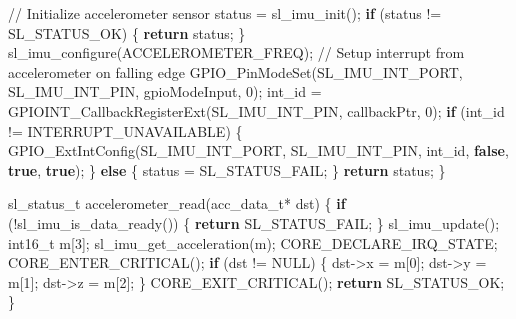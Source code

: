 \documentclass[
  9pt,
  letterpaper,
  abstract,
  titlepage]{scrbook}
\newenvironment{Shaded}{\begin{snugshade}}{\end{snugshade}}
\newcommand{\CommentTok}[1]{\textcolor[rgb]{0.37,0.37,0.37}{#1}}
\newcommand{\ControlFlowTok}[1]{\textcolor[rgb]{0.00,0.23,0.31}{\textbf{#1}}}
\newcommand{\DataTypeTok}[1]{\textcolor[rgb]{0.68,0.00,0.00}{#1}}
\newcommand{\DecValTok}[1]{\textcolor[rgb]{0.68,0.00,0.00}{#1}}
\newcommand{\KeywordTok}[1]{\textcolor[rgb]{0.00,0.23,0.31}{\textbf{#1}}}
\newcommand{\NormalTok}[1]{\textcolor[rgb]{0.00,0.23,0.31}{#1}}
\newcommand{\OperatorTok}[1]{\textcolor[rgb]{0.37,0.37,0.37}{#1}}
\begin{document}
\begin{Shaded}
\begin{Highlighting}[]
  \CommentTok{// Initialize accelerometer sensor}
\NormalTok{  status }\OperatorTok{=}\NormalTok{ sl\_imu\_init}\OperatorTok{();}
  \ControlFlowTok{if} \OperatorTok{(}\NormalTok{status }\OperatorTok{!=}\NormalTok{ SL\_STATUS\_OK}\OperatorTok{)} \OperatorTok{\{}
    \ControlFlowTok{return}\NormalTok{ status}\OperatorTok{;}
  \OperatorTok{\}}
\NormalTok{  sl\_imu\_configure}\OperatorTok{(}\NormalTok{ACCELEROMETER\_FREQ}\OperatorTok{);}
  \CommentTok{// Setup interrupt from accelerometer on falling edge}
\NormalTok{  GPIO\_PinModeSet}\OperatorTok{(}\NormalTok{SL\_IMU\_INT\_PORT}\OperatorTok{,}\NormalTok{ SL\_IMU\_INT\_PIN}\OperatorTok{,}\NormalTok{ gpioModeInput}\OperatorTok{,} \DecValTok{0}\OperatorTok{);}
\NormalTok{  int\_id }\OperatorTok{=}\NormalTok{ GPIOINT\_CallbackRegisterExt}\OperatorTok{(}\NormalTok{SL\_IMU\_INT\_PIN}\OperatorTok{,}\NormalTok{ callbackPtr}\OperatorTok{,} \DecValTok{0}\OperatorTok{);}
  \ControlFlowTok{if} \OperatorTok{(}\NormalTok{int\_id }\OperatorTok{!=}\NormalTok{ INTERRUPT\_UNAVAILABLE}\OperatorTok{)} \OperatorTok{\{}
\NormalTok{    GPIO\_ExtIntConfig}\OperatorTok{(}\NormalTok{SL\_IMU\_INT\_PORT}\OperatorTok{,}\NormalTok{ SL\_IMU\_INT\_PIN}\OperatorTok{,}\NormalTok{ int\_id}\OperatorTok{,} \KeywordTok{false}\OperatorTok{,} \KeywordTok{true}\OperatorTok{,} \KeywordTok{true}\OperatorTok{);}
  \OperatorTok{\}} \ControlFlowTok{else} \OperatorTok{\{}
\NormalTok{    status }\OperatorTok{=}\NormalTok{ SL\_STATUS\_FAIL}\OperatorTok{;}
  \OperatorTok{\}}
  \ControlFlowTok{return}\NormalTok{ status}\OperatorTok{;}
\OperatorTok{\}}

\NormalTok{sl\_status\_t accelerometer\_read}\OperatorTok{(}\NormalTok{acc\_data\_t}\OperatorTok{*}\NormalTok{ dst}\OperatorTok{)}
\OperatorTok{\{}
  \ControlFlowTok{if} \OperatorTok{(!}\NormalTok{sl\_imu\_is\_data\_ready}\OperatorTok{())} \OperatorTok{\{}
    \ControlFlowTok{return}\NormalTok{ SL\_STATUS\_FAIL}\OperatorTok{;}
  \OperatorTok{\}}
\NormalTok{  sl\_imu\_update}\OperatorTok{();}
  \DataTypeTok{int16\_t}\NormalTok{ m}\OperatorTok{[}\DecValTok{3}\OperatorTok{];}
\NormalTok{  sl\_imu\_get\_acceleration}\OperatorTok{(}\NormalTok{m}\OperatorTok{);}
\NormalTok{  CORE\_DECLARE\_IRQ\_STATE}\OperatorTok{;}
\NormalTok{  CORE\_ENTER\_CRITICAL}\OperatorTok{();}
  \ControlFlowTok{if} \OperatorTok{(}\NormalTok{dst }\OperatorTok{!=}\NormalTok{ NULL}\OperatorTok{)} \OperatorTok{\{}
\NormalTok{    dst}\OperatorTok{{-}\textgreater{}}\NormalTok{x }\OperatorTok{=}\NormalTok{ m}\OperatorTok{[}\DecValTok{0}\OperatorTok{];}
\NormalTok{    dst}\OperatorTok{{-}\textgreater{}}\NormalTok{y }\OperatorTok{=}\NormalTok{ m}\OperatorTok{[}\DecValTok{1}\OperatorTok{];}
\NormalTok{    dst}\OperatorTok{{-}\textgreater{}}\NormalTok{z }\OperatorTok{=}\NormalTok{ m}\OperatorTok{[}\DecValTok{2}\OperatorTok{];}
  \OperatorTok{\}}
\NormalTok{  CORE\_EXIT\_CRITICAL}\OperatorTok{();}
  \ControlFlowTok{return}\NormalTok{ SL\_STATUS\_OK}\OperatorTok{;}
\OperatorTok{\}}
\end{Highlighting}
\end{Shaded}
\end{document}
